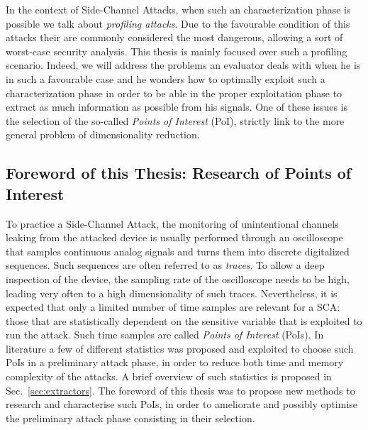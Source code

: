 In the context of Side-Channel Attacks, when such an characterization phase is possible we talk about \emph{profiling attacks}. Due to the favourable condition of this attacks their are commonly considered the most dangerous, allowing a sort of worst-case security analysis. This thesis is mainly focused over such a profiling scenario. Indeed, we will address the problems an evaluator deals with when he is in such a favourable case and he wonders how to optimally exploit such a characterization phase in order to be able in the proper exploitation phase to extract as much information as possible from his signals. One of these issues is the selection of the so-called \emph{Points of Interest} (PoI), strictly link to the more general problem of dimensionality reduction.

\subsection{Foreword of this Thesis: Research of Points of Interest}
To practice a Side-Channel Attack, the monitoring of unintentional channels leaking from the attacked device is usually performed through an oscilloscope that samples continuous analog signals and turns them into discrete digitalized sequences. Such sequences are often referred to as \emph{traces}. To allow a deep inspection of the device, the sampling rate of the oscilloscope needs to be high, leading very often to a high dimensionality of such traces. Nevertheless,  it is expected that only a limited number of time samples are relevant for a SCA: those that are statistically dependent on the sensitive variable that is exploited to run the attack. Such time samples are called \emph{Points of Interest} (PoIs). In literature a few of different statistics was proposed and exploited to choose such PoIs in a preliminary attack phase, in order to reduce both time and memory complexity of the attacks. A brief overview of such statistics is proposed in Sec.~\ref{sec:extractors}. The foreword of this thesis was to propose new methods to research and characterise such PoIs, in order to ameliorate and possibly optimise the preliminary attack phase consisting in their selection. 

